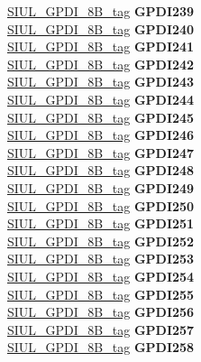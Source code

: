\begin{DoxyCompactItemize}
\begin{tabbing}
\>\>\mbox{\hyperlink{unionSIUL__GPDI__8B__tag}{SIUL\_GPDI\_8B\_tag}} {\bfseries GPDI239}\\
\>\>\mbox{\hyperlink{unionSIUL__GPDI__8B__tag}{SIUL\_GPDI\_8B\_tag}} {\bfseries GPDI240}\\
\>\>\mbox{\hyperlink{unionSIUL__GPDI__8B__tag}{SIUL\_GPDI\_8B\_tag}} {\bfseries GPDI241}\\
\>\>\mbox{\hyperlink{unionSIUL__GPDI__8B__tag}{SIUL\_GPDI\_8B\_tag}} {\bfseries GPDI242}\\
\>\>\mbox{\hyperlink{unionSIUL__GPDI__8B__tag}{SIUL\_GPDI\_8B\_tag}} {\bfseries GPDI243}\\
\>\>\mbox{\hyperlink{unionSIUL__GPDI__8B__tag}{SIUL\_GPDI\_8B\_tag}} {\bfseries GPDI244}\\
\>\>\mbox{\hyperlink{unionSIUL__GPDI__8B__tag}{SIUL\_GPDI\_8B\_tag}} {\bfseries GPDI245}\\
\>\>\mbox{\hyperlink{unionSIUL__GPDI__8B__tag}{SIUL\_GPDI\_8B\_tag}} {\bfseries GPDI246}\\
\>\>\mbox{\hyperlink{unionSIUL__GPDI__8B__tag}{SIUL\_GPDI\_8B\_tag}} {\bfseries GPDI247}\\
\>\>\mbox{\hyperlink{unionSIUL__GPDI__8B__tag}{SIUL\_GPDI\_8B\_tag}} {\bfseries GPDI248}\\
\>\>\mbox{\hyperlink{unionSIUL__GPDI__8B__tag}{SIUL\_GPDI\_8B\_tag}} {\bfseries GPDI249}\\
\>\>\mbox{\hyperlink{unionSIUL__GPDI__8B__tag}{SIUL\_GPDI\_8B\_tag}} {\bfseries GPDI250}\\
\>\>\mbox{\hyperlink{unionSIUL__GPDI__8B__tag}{SIUL\_GPDI\_8B\_tag}} {\bfseries GPDI251}\\
\>\>\mbox{\hyperlink{unionSIUL__GPDI__8B__tag}{SIUL\_GPDI\_8B\_tag}} {\bfseries GPDI252}\\
\>\>\mbox{\hyperlink{unionSIUL__GPDI__8B__tag}{SIUL\_GPDI\_8B\_tag}} {\bfseries GPDI253}\\
\>\>\mbox{\hyperlink{unionSIUL__GPDI__8B__tag}{SIUL\_GPDI\_8B\_tag}} {\bfseries GPDI254}\\
\>\>\mbox{\hyperlink{unionSIUL__GPDI__8B__tag}{SIUL\_GPDI\_8B\_tag}} {\bfseries GPDI255}\\
\>\>\mbox{\hyperlink{unionSIUL__GPDI__8B__tag}{SIUL\_GPDI\_8B\_tag}} {\bfseries GPDI256}\\
\>\>\mbox{\hyperlink{unionSIUL__GPDI__8B__tag}{SIUL\_GPDI\_8B\_tag}} {\bfseries GPDI257}\\
\>\>\mbox{\hyperlink{unionSIUL__GPDI__8B__tag}{SIUL\_GPDI\_8B\_tag}} {\bfseries GPDI258}\\

\end{tabbing}
\end{DoxyCompactItemize}

